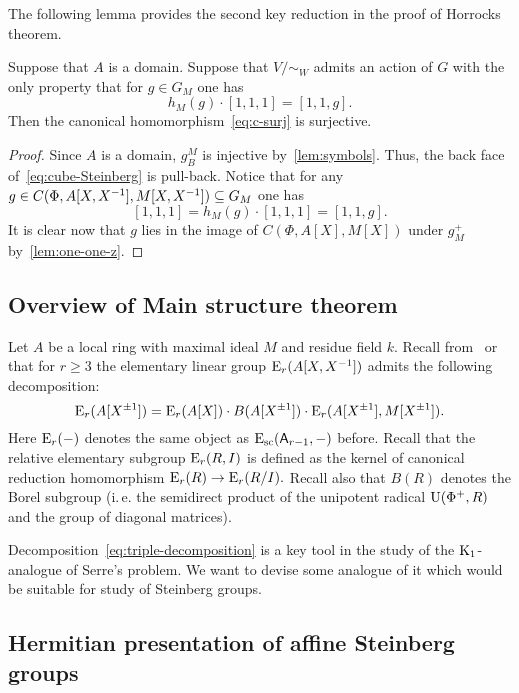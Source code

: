 The following lemma provides the second key reduction in the proof of Horrocks theorem.
\begin{lemma}
    Suppose that $A$ is a domain.
    Suppose that $V/\sim_W$ admits an action of $G$ with the only property that
      for $g \in G_M$ one has \[ h_M(g) \cdot [1, 1, 1] = [1, 1, g]. \]
    Then the canonical homomorphism~\eqref{eq:c-surj} is surjective.
\end{lemma}
\begin{proof}
  Since $A$ is a domain, $g^M_B$ is injective by~\cref{lem:symbols}.
    Thus, the back face of~\eqref{eq:cube-Steinberg} is pull-back.
  Notice that for any $g \in C(\Phi, A[X, X^{-1}], M[X, X^{-1}]) \subseteq G_M$ one has
    \[ [1, 1, 1] = h_M(g) \cdot [1, 1, 1] = [1, 1, g].\]
  It is clear now that $g$ lies in the image of $C(\Phi, A[X], M[X])$ under $g^+_M$ by~\cref{lem:one-one-z}.
\end{proof}

\subsection{Overview of Main structure theorem}

Let $A$ be a local ring with maximal ideal $M$ and residue field $k$.
Recall from~\cite[\S~4]{Su77} or~\cite[\S~VI.6]{Lam10} that for $r \geq 3$ the elementary linear group $\operatorname{E}_r(A[X, X^{-1}])$ admits the following decomposition:
\begin{equation}\label{eq:triple-decomposition}
\operatorname{E}_r(A[X^{\pm 1}]) = \operatorname{E}_r(A[X]) \cdot B(A[X^{\pm 1}]) \cdot \operatorname{E}_r(A[X^{\pm 1}], M[X^{\pm 1}]).
\end{equation}
Here $\operatorname{E}_r(-)$ denotes the same object as $\operatorname{E}_\mathrm{sc}(\mathsf{A}_{r - 1}, -)$ before.
Recall that the relative elementary subgroup $\operatorname{E}_r(R, I)$ is defined as the kernel of canonical reduction homomorphism $\operatorname{E}_r(R) \to \operatorname{E}_r(R/I).$
Recall also that $B(R)$ denotes the Borel subgroup (i.\,e. the semidirect product of the unipotent radical $\operatorname{U}(\Phi^+, R)$ and the group of diagonal matrices).

Decomposition~\eqref{eq:triple-decomposition} is a key tool in the study of the {$\operatorname{K}_1$-analogue of Serre's problem}.
We want to devise some analogue of it which would be suitable for study of Steinberg groups.

\subsection{Hermitian presentation of affine Steinberg groups}

